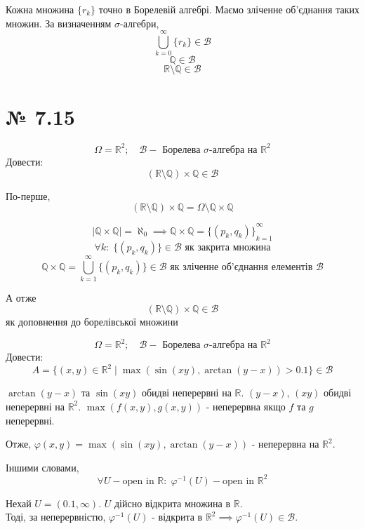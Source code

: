\documentclass[11pt, a4paper]{article} %
\begin{document}
Кожна множина $\{r_k\}$ точно в Борелевій алгебрі. Маємо зліченне об'єднання таких множин.
За визначенням $\sigma$-алгебри, 
$$\bigcup_{k=0}^\infty \{r_k\} \in \mathcal{B}$$
$$\mathbb{Q} \in \mathcal{B}$$
$$\mathbb{R} \setminus \mathbb{Q} \in \mathcal{B}$$
\qedsymbol


\section*{№ 7.15}
\begin{mdframed}
    $$\Omega = \mathbb{R}^2;\quad \mathcal{B} - \text{ Борелева $\sigma$-алгебра на } \mathbb{R}^2$$
    Довести: $$(\mathbb{R} \setminus \mathbb{Q}) \times \mathbb{Q} \in \mathcal{B}$$
\end{mdframed}

По-перше, 
$$(\mathbb{R} \setminus \mathbb{Q}) \times \mathbb{Q} = \Omega \setminus \mathbb{Q} \times \mathbb{Q} $$

$$|\mathbb{Q} \times \mathbb{Q}| = \aleph_0 \implies \mathbb{Q} \times \mathbb{Q} = \left.\{(p_k,q_k)\}\right._{k=1}^{\infty}$$
$$\forall k:\; \{(p_k,q_k)\} \in \mathcal{B} \text{ як закрита множина}$$
$$\mathbb{Q} \times \mathbb{Q} = \bigcup_{k=1}^\infty \{(p_k,q_k)\} \in \mathcal{B} \text{ як зліченне об'єднання елементів $\mathcal{B}$} $$

А отже $$(\mathbb{R} \setminus \mathbb{Q}) \times \mathbb{Q} \in \mathcal{B}$$ як доповнення до борелівської множини
\qedsymbol

\begin{mdframed}
    $$\Omega = \mathbb{R}^2;\quad \mathcal{B} - \text{ Борелева $\sigma$-алгебра на } \mathbb{R}^2$$
    Довести: 
    $$A = \{(x,y)\in\mathbb{R}^2 \;|\; \max(\sin(xy), \arctan(y-x)) > 0.1\} \in \mathcal{B}$$
\end{mdframed}

$\arctan(y-x)$ та $\sin(xy)$ обидві неперервні на $\mathbb{R}$.
$(y-x)$, $(xy)$ обидві неперервні на $\mathbb{R}^2$.
$\max(f(x,y),g(x,y))$ - неперервна якщо $f$ та $g$ неперервні.

Отже, $\varphi(x,y) = \max(\sin(xy), \arctan(y-x))$ - неперервна на $\mathbb{R}^2$.

Іншими словами, 
$$\forall U - \text{open in }\mathbb{R}:\; \varphi^{-1}(U) - \text{open in }\mathbb{R}^2$$

Нехай $U = (0.1,\infty)$. $U$ дійсно відкрита  множина в $\mathbb{R}$. \\
Тоді, за неперервністю, $\varphi^{-1}(U)$ - відкрита в $\mathbb{R}^2 \implies \varphi^{-1}(U) \in \mathcal{B}$.
\end{document}
